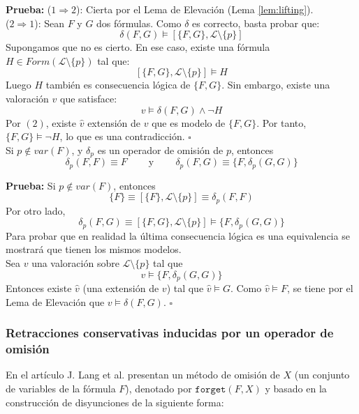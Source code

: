 \noindent \textbf{Prueba:} ($1 \Rightarrow 2$): Cierta por el Lema de Elevación (Lema \ref{lem:lifting}).\\
($2 \Rightarrow 1$): Sean $F$ y $G$ dos fórmulas. Como $\delta$ es correcto, basta probar que:
$$\delta (F,G) \vDash [\{ F,G \}, \mathcal{L} \setminus \{ p \}]$$
Supongamos que no es cierto. En ese caso, existe una fórmula $H \in Form(\mathcal{L} \setminus \{ p \})$ tal que: 
$$[\{ F,G \}, \mathcal{L} \setminus \{ p \}] \vDash H$$ 
Luego $H$ también es consecuencia lógica de $\{ F,G \}$. Sin embargo, existe una valoración $v$ que satisface: 
$$v \vDash \delta (F,G) \wedge \neg H$$ 
Por $(2)$, existe $\hat{v}$ extensión de $v$ que es modelo de $\{ F,G \}$. Por tanto, $\{ F,G \} \vDash \neg H$, lo que es una contradicción. \hspace{10.5cm} $\square$ \\

\cor Si $p \notin var(F)$, y $\delta_p$ es un operador de omisión de $p$, entonces
$$\delta_p(F,F) \equiv F \;\;\;\;\;\;\;\; \text{y} \;\;\;\;\;\;\;\; \delta_p (F,G) \equiv \{ F,\delta_p (G,G) \}$$

\noindent \label{cor:pnotinvar} \textbf{Prueba:} Si $p \notin var(F)$, entonces 
$$\{ F \} \equiv [\{ F \} ,\mathcal{L} \setminus \{ p \}] \equiv \delta_p (F,F)$$
Por otro lado, 
$$\delta_p (F,G) \equiv [\{ F,G \} , \mathcal{L} \setminus \{ p \}] \vDash \{ F,\delta_p (G,G) \}$$ Para probar que en realidad la última consecuencia lógica es una equivalencia se mostrará que tienen los mismos modelos.\\
Sea $v$ una valoración sobre $\mathcal{L} \setminus \{ p \}$ tal que $$v \vDash \{ F,\delta_p (G,G) \}$$ Entonces existe $\hat{v}$ (una extensión de $v$) tal que $\hat{v} \vDash G$. Como $\hat{v} \vDash F$, se tiene por el Lema de Elevación que $v \vDash \delta (F,G)$. \hspace{10cm} $\square$ 

\newpage 
 
\subsubsection{Retracciones conservativas inducidas por un operador de omisión} 
 
En el artículo \cite{Lang2003} J. Lang et al.  presentan un método de omisión de $X$ (un conjunto de variables de la fórmula $F$), denotado por $\texttt{forget}(F,X)$ y basado en la construcción de disyunciones de la siguiente forma:\\

